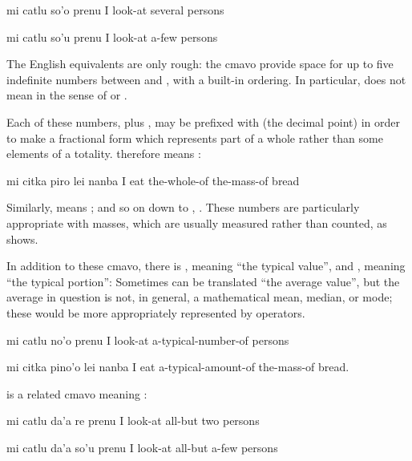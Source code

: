 \begin{example}
mi catlu so'o prenu\n
I look-at several persons
\end{example}

\begin{example}
mi catlu so'u prenu\n
I look-at a-few persons
\end{example}

The English equivalents are only rough: the cmavo provide space
    for up to five indefinite numbers between  and ,
    with a built-in ordering. In particular,  does not mean
     in the sense of  or . 

Each of these numbers, plus , may be prefixed with
     (the decimal point) in order to make a fractional form
    which represents part of a whole rather than some elements of a
    totality.  therefore means :
\begin{example}
mi citka piro lei nanba\n
I eat the-whole-of the-mass-of bread
\end{example}

Similarly,  means ; and so on
    down to , . These numbers are
    particularly appropriate with masses, which are usually
    measured rather than counted, as  shows. 

In addition to these cmavo, there is , meaning ``the
    typical value'', and , meaning ``the typical
    portion'': Sometimes  can be translated ``the average
    value'', but the average in question is not, in general, a
    mathematical mean, median, or mode; these would be more
    appropriately represented by operators.
\begin{example}
mi catlu no'o prenu\n
I look-at a-typical-number-of persons
\end{example}

\begin{example}
mi citka pino'o lei nanba\n
I eat a-typical-amount-of the-mass-of bread.
\end{example}

 is a related cmavo meaning :
\begin{example}
mi catlu da'a re prenu\n
I look-at all-but two persons
\end{example}

\begin{example}
mi catlu da'a so'u prenu\n
I look-at all-but a-few persons
\end{example}

